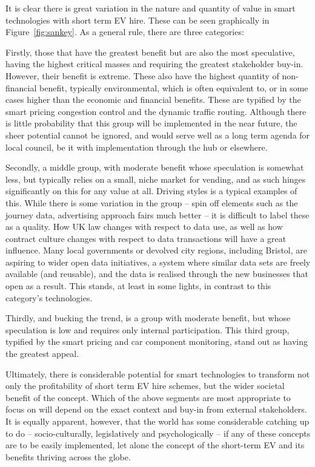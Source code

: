 \documentclass[conference]{IEEEtran}
\begin{document}
It is clear there is great variation in the nature and quantity of
value in smart technologies with short term EV hire. These can be seen
graphically in Figure~\ref{fig:sankey}. As a general rule, there are
three categories: 

\begin{compactitem}
\item Firstly, those that have the greatest benefit but are also the
  most speculative, having the highest critical masses and requiring
  the greatest stakeholder buy-in. However, their benefit is
  extreme. These also have the highest quantity of non-financial
  benefit, typically environmental, which is often equivalent to, or
  in some cases higher than the economic and financial benefits. These
  are typified by the smart pricing congestion control and the dynamic
  traffic routing. Although there is little probability that this
  group will be implemented in the near future, the sheer potential
  cannot be ignored, and would serve well as a long term agenda for
  local council, be it with implementation through the hub or
  elsewhere.
\item Secondly, a middle group, with moderate benefit whose
  speculation is somewhat less, but typically relies on a small, niche
  market for vending, and as such hinges significantly on this for any
  value at all. Driving styles is a typical examples of this. While
  there is some variation in the group -- spin off elements such as the
  journey data, advertising approach fairs much better -- it is
  difficult to label these as a quality. How UK law changes with respect
  to data use, as well as how contract culture changes with respect to
  data transactions will have a great influence. Many local
  governments or devolved city regions, including Bristol, are
  aspiring to wider open data initiatives, a
  system where similar data sets are freely available (and reusable),
  and the data is
  realised through the new businesses that open as a result. This
  stands, at least in some lights, in contrast to this category’s
  technologies. 
\item Thirdly, and bucking the trend, is a group with moderate
  benefit, but whose speculation is low and requires only internal
  participation. This third group, typified by the smart pricing and
  car component monitoring, stand out as having the greatest
  appeal. 
\end{compactitem}

Ultimately, there is considerable potential for smart technologies to
transform not only the profitability of short term EV hire schemes,
but the wider societal benefit of the concept. Which of the above
segments are most appropriate to focus on will depend on the exact
context and buy-in from external stakeholders. It is equally apparent,
however, that the world has some considerable catching up to do --
socio-culturally, legislatively and psychologically -- if any of these
concepts are to be easily implemented, let alone the concept of the
short-term EV and its benefits thriving across the globe.
\end{document}
